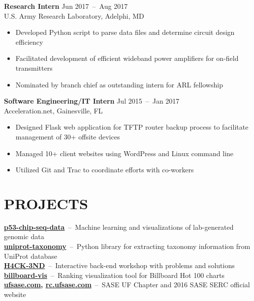 \documentclass[line,resmargin]{res}
\begin{document}
\begin{resume}
    \textbf{Research Intern}    \hfill Jun 2017~--~Aug 2017 \\
    U.S. Army Research Laboratory, Adelphi, MD
    \begin{itemize}  \itemsep -2pt
        \item Developed Python script to parse data files and determine circuit design efficiency
        \item Facilitated development of efficient wideband power amplifiers for on-field transmitters
        \item Nominated by branch chief as outstanding intern for ARL fellowship
    \end{itemize}

    \textbf{Software Engineering/IT Intern}    \hfill Jul 2015~--~Jan 2017 \\
    Acceleration.net, Gainesville, FL
    \begin{itemize}  \itemsep -2pt
        \item Designed Flask web application for TFTP router backup process to facilitate management of 30+ offsite devices
        \item Managed 10+ client websites using WordPress and Linux command line
        \item Utilized Git and Trac to coordinate efforts with co-workers
    \end{itemize}

\section{PROJECTS}
    \textbf{\href{https://github.com/zhoulab/p53-chip-seq-data}{p53-chip-seq-data}}~--~Machine learning and visualizations of lab-generated genomic data \\
    \textbf{\href{https://github.com/zhoulab/uniprot-taxonomy}{uniprot-taxonomy}}~--~Python library for extracting taxonomy information from UniProt database \\
    \textbf{\href{https://victorl.in/hack-end}{H4CK-3ND}}~--~Interactive back-end workshop with problems and solutions \\
    \textbf{\href{https://victorl.in/billboard-vis}{billboard-vis}}~--~Ranking visualization tool for Billboard Hot 100 charts \\
    \textbf{\href{http://ufsase.com}{ufsase.com}, \href{http://rc.ufsase.com}{rc.ufsase.com}}~--~SASE UF Chapter and 2016 SASE SERC official website


\end{resume}
\end{document}
